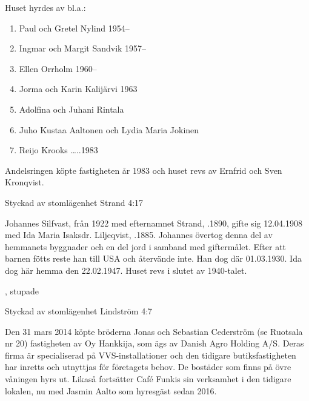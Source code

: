Huset hyrdes av bl.a.:
\begin{enumerate}
  \item Paul och Gretel Nylind  1954--
  \item Ingmar och Margit Sandvik 1957--
  \item Ellen Orrholm 1960--
  \item Jorma och Karin Kalijärvi 1963
  \item Adolfina och Juhani Rintala
  \item Juho Kustaa Aaltonen och Lydia Maria Jokinen
  \item Reijo Krooks   …..1983
\end{enumerate}
Andelsringen köpte fastigheten år 1983 och huset revs av Ernfrid och Sven Kronqvist.




Styckad av stomlägenhet Strand 4:17

Johannes Silfvast, från 1922 med efternamnet Strand, .1890, gifte sig 12.04.1908 med Ida Maria Isaksdr. Liljeqvist, .1885. Johannes övertog denna del av hemmanets byggnader och en del jord i samband med giftermålet. Efter att barnen fötts reste han till USA och återvände inte. Han dog där 01.03.1930. Ida dog här hemma den 22.02.1947. Huset revs i slutet av 1940-talet.
\begin{jhchildren}
  \item {}
  \item {}
  \item {}
  \item {}
  \item {}, stupade
  \item {}
\end{jhchildren}



Styckad av stomlägenhet Lindström 4:7

Den 31 mars 2014 köpte bröderna Jonas och Sebastian Cederström (se Ruotsala nr 20) fastigheten av Oy Hankkija, som ägs av Danish Agro Holding A/S. Deras firma är specialiserad på VVS-installationer och den tidigare butiksfastigheten har inretts och utnyttjas för företagets behov. De bostäder som finns på övre våningen hyrs ut. Likaså fortsätter Café Funkis sin verksamhet i den tidigare lokalen, nu med Jasmin Aalto som hyresgäst sedan 2016.



